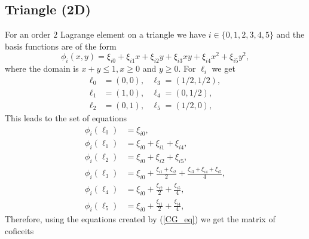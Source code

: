 \documentclass[12pt,a4paper]{article}
\begin{document}
\subsection{Triangle (2D)}
For an order $2$ Lagrange element on a triangle we have $i \in \{0, 1, 2,3,4,5\}$ and the basis functions are of the form
\begin{equation}
\phi_i(x,y) = \xi_{i0} + \xi_{i1} x + \xi_{i2} y + \xi_{i3} xy + \xi_{i4} x^2 + \xi_{i5}y^2,
\end{equation}
where the domain is $x+y\leq 1, x \geq 0$ and $y\geq 0$. For $\ell_i$ we get
\begin{align}
\ell_0 &= (0,0), &\ell_3 = (1/2,1/2), \\
\ell_1 &= (1,0), &\ell_4 = (0,1/2), \\
\ell_2 &= (0,1), &\ell_5 = (1/2,0),
\end{align}
This leads to the set of equations
\begin{align}
\phi_i(\ell_0) &= \xi_{i0}, \\
\phi_i(\ell_1) &= \xi_{i0} + \xi_{i1} + \xi_{i4}, \\
\phi_i(\ell_2) &= \xi_{i0} + \xi_{i2} + \xi_{i5}, \\
\phi_i(\ell_3) &= \xi_{i0} + \frac{\xi_{i1}+\xi_{i2}}{2} + \frac{\xi_{i3} + \xi_{i4} + \xi_{i5}}{4}, \\
\phi_i(\ell_4) &= \xi_{i0} + \frac{\xi_{i2}}{2} + \frac{\xi_{i5}}{4}, \\
\phi_i(\ell_5) &= \xi_{i0} + \frac{\xi_{i1}}{2} + \frac{\xi_{i4}}{4},
\end{align}
Therefore, using the equations created by (\ref{CG_eq}) we get the matrix of coficeits
\end{document}
